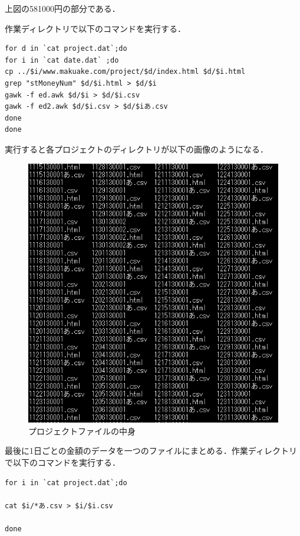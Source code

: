 上図の581000円の部分である．

作業ディレクトリで以下のコマンドを実行する．

\begin{verbatim}
for d in `cat project.dat`;do
for i in `cat date.dat` ;do
cp ../$i/www.makuake.com/project/$d/index.html $d/$i.html
grep "stMoneyNum" $d/$i.html > $d/$i
gawk -f ed.awk $d/$i > $d/$i.csv
gawk -f ed2.awk $d/$i.csv > $d/$iあ.csv
done
done
\end{verbatim}

\newpage
実行すると各プロジェクトのディレクトリが以下の画像のようになる．

\begin{figure}[H]
\centering
\includegraphics[width=16cm]{seiri1.PNG}
\caption{プロジェクトファイルの中身}\label{サンプル図}
\end{figure}

\newpage
最後に1日ごとの金額のデータを一つのファイルにまとめる．作業ディレクトリで以下のコマンドを実行する．

\begin{verbatim}
for i in `cat project.dat`;do

cat $i/*あ.csv > $i/$i.csv

done

\end{verbatim}


